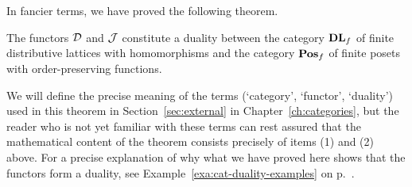 In fancier terms, we have proved the following theorem.    
\begin{theorem}\label{thm:birkhoffduality}
The functors $\mathcal{D}$ and $\mathcal{J}$ constitute a duality between the category $\mathbf{DL}_f$ of finite distributive lattices with homomorphisms and the category $\mathbf{Pos}_f$ of finite posets with order-preserving functions.
\end{theorem}
We will define the precise meaning of the terms (`category', `functor', `duality') used in this theorem in Section~\ref{sec:external} in Chapter~\ref{ch:categories},
but the reader who is not yet familiar with these terms can rest assured that the mathematical content of the theorem consists precisely of items (1) and (2) above. For a precise explanation of why what we have proved here shows that the functors form a duality, see Example~\ref{exa:cat-duality-examples} on p.~\pageref{exa:cat-duality-examples}.\\

